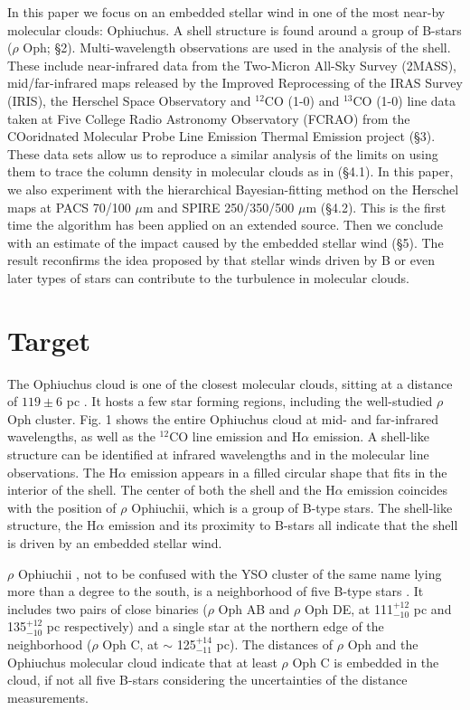 \documentclass[11pt,a4paper]{emulateapj}
\begin{document}
In this paper we focus on an embedded stellar wind in one of the most near-by molecular clouds: Ophiuchus. A shell structure is found around a group of B-stars ($\rho$ Oph; \S2). Multi-wavelength observations are used in the analysis of the shell. These include near-infrared data from the Two-Micron All-Sky Survey (2MASS), mid/far-infrared maps released by the Improved Reprocessing of the IRAS Survey (IRIS), the Herschel Space Observatory and $^{12}$CO (1-0) and $^{13}$CO (1-0) line data taken at Five College Radio Astronomy Observatory (FCRAO) from the COoridnated Molecular Probe Line Emission Thermal Emission \citep[COMPLETE;]{Ridge_2006} project (\S3). These data sets allow us to reproduce a similar analysis of the limits on using them to trace the column density in molecular clouds as in \citet{Goodman_2009} (\S4.1). In this paper, we also experiment with the hierarchical Bayesian-fitting method \citep{Kelly_2012} on the Herschel maps at PACS 70/100 $\mu$m and SPIRE 250/350/500 $\mu$m (\S4.2). This is the first time the algorithm has been applied on an extended source. Then we conclude with an estimate of the impact caused by the embedded stellar wind (\S5). The result reconfirms the idea proposed by \citet{Arce_2011} that stellar winds driven by B or even later types of stars can contribute to the turbulence in molecular clouds.

\section{Target}
The Ophiuchus cloud is one of the closest molecular clouds, sitting at a distance of $119 \pm 6$ pc \citep{Lombardi_2008}. It hosts a few star forming regions, including the well-studied $\rho$ Oph cluster. Fig. 1 shows the entire Ophiuchus cloud at mid- and far-infrared wavelengths, as well as the $^{12}$CO line emission and H$\alpha$ emission. A shell-like structure can be identified at infrared wavelengths and in the molecular line observations. The H$\alpha$ emission appears in a filled circular shape that fits in the interior of the shell. The center of both the shell and the H$\alpha$ emission coincides with the position of $\rho$ Ophiuchii, which is a group of B-type stars. The shell-like structure, the H$\alpha$ emission and its proximity to B-stars all indicate that the shell is driven by an embedded stellar wind. 

$\rho$ Ophiuchii \citep[16h 25m 35.12s, -23d 26m 49.82s, J2000,]{van_Leeuwen_2007}, not to be confused with the YSO cluster of the same name lying more than a degree to the south, is a neighborhood of five B-type stars \citep{Cordiner_2013}. It includes two pairs of close binaries ($\rho$ Oph AB and $\rho$ Oph DE, at 111$^{+12}_{-10}$ pc and 135$^{+12}_{-10}$ pc respectively) and a single star at the northern edge of the neighborhood ($\rho$ Oph C, at $\sim$ 125$^{+14}_{-11}$ pc). The distances of $\rho$ Oph and the Ophiuchus molecular cloud indicate that at least $\rho$ Oph C is embedded in the cloud, if not all five B-stars considering the uncertainties of the distance measurements.
\end{document}
